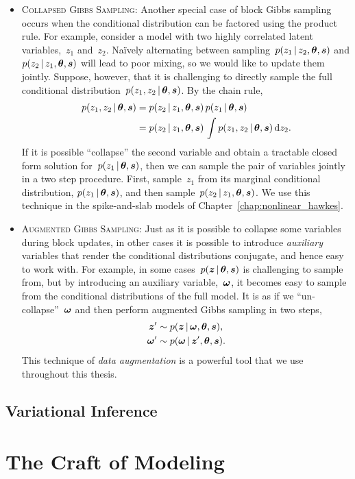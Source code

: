 \begin{itemize}
\item \textsc{Collapsed Gibbs Sampling}: Another special case of block
  Gibbs sampling occurs when the conditional distribution can be
  factored using the product rule. For example, consider a model with
  two highly correlated latent variables,~$z_1$ and~$z_2$.  Na\"ively
  alternating between sampling~${p(z_1 \,|\, z_2, \boldsymbol{\theta}, \boldsymbol{s})}$ and
  ${p(z_2 \,|\, z_1, \boldsymbol{\theta}, \boldsymbol{s})}$ will lead to poor mixing, so we
  would like to update them jointly.  Suppose, however, that it is
  challenging to directly sample the full conditional
  distribution~$p(z_1, z_2 \,|\, \boldsymbol{\theta}, \boldsymbol{s})$. By the chain rule,
  \begin{align*}
    p(z_1, z_2 \,|\, \boldsymbol{\theta}, \boldsymbol{s}) 
    &= p(z_2 \,|\, z_1, \boldsymbol{\theta}, \boldsymbol{s}) \, 
      p(z_1 \,|\, \boldsymbol{\theta}, \boldsymbol{s}) \\
    &= p(z_2 \,|\, z_1, \boldsymbol{\theta}, \boldsymbol{s}) \, 
      \int p(z_1, z_2 \,|\, \boldsymbol{\theta}, \boldsymbol{s}) \, \mathrm{d}z_2.
  \end{align*}
  If it is possible ``collapse'' the second variable and obtain a
  tractable closed form solution for~$p(z_1 \,|\, \boldsymbol{\theta}, \boldsymbol{s})$,
  then we can sample the pair of variables jointly in a two step
  procedure. First, sample~$z_1$ from its marginal conditional
  distribution, $p(z_1 \,|\, \boldsymbol{\theta}, \boldsymbol{s})$, and then
  sample~${p(z_2 \,|\, z_1, \boldsymbol{\theta}, \boldsymbol{s})}$. We use this technique 
  in the spike-and-slab models of Chapter~\ref{chap:nonlinear_hawkes}.
  
\item \textsc{Augmented Gibbs Sampling}: Just as it is possible to
  collapse some variables during block updates, in other cases it is
  possible to introduce \emph{auxiliary} variables that render the
  conditional distributions conjugate, and hence easy to work
  with. For example, in some cases~$p(\boldsymbol{z} \,|\, \boldsymbol{\theta}, \boldsymbol{s})$ is
  challenging to sample from, but by introducing an auxiliary
  variable,~$\boldsymbol{\omega}$, it becomes easy to sample from the conditional
  distributions of the full model. It is as if we ``un-collapse''~$\boldsymbol{\omega}$
  and then perform augmented Gibbs sampling in two steps,
  \begin{align*}
    \boldsymbol{z}' &\sim p(\boldsymbol{z} \,|\, \boldsymbol{\omega}, \boldsymbol{\theta}, \boldsymbol{s}), \\
    \boldsymbol{\omega}' &\sim p(\boldsymbol{\omega} \,|\, \boldsymbol{z}', \boldsymbol{\theta}, \boldsymbol{s}).
  \end{align*}
  This technique of \emph{data augmentation} is a powerful tool that we use 
  throughout this thesis.
\end{itemize}



\subsection{Variational Inference}


\section{The Craft of Modeling}
